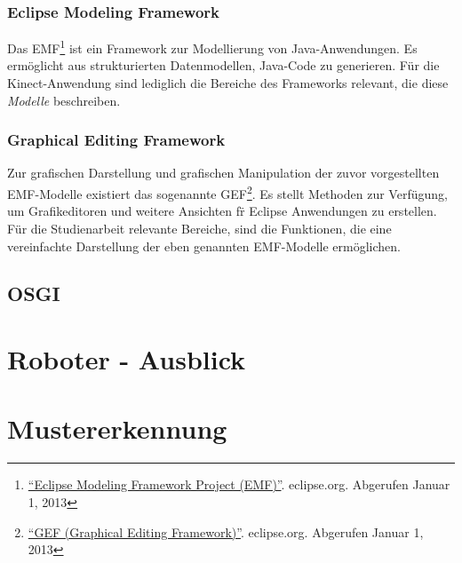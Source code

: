 \subsubsection{Eclipse Modeling Framework}
Das \gls{EMF}\footnote{\href{http://www.eclipse.org/modeling/emf/}{\enquote{Eclipse Modeling Framework Project (EMF)}}. eclipse.org. Abgerufen Januar 1, 2013} ist ein Framework zur Modellierung von Java-Anwendungen.
Es erm\"oglicht aus strukturierten Datenmodellen, Java-Code zu generieren. F\"ur die Kinect-Anwendung sind lediglich die Bereiche des Frameworks relevant, die diese \textit{Modelle} beschreiben.
 
\subsubsection{Graphical Editing Framework}
Zur grafischen Darstellung und grafischen Manipulation der zuvor vorgestellten EMF-Modelle existiert das sogenannte \gls{GEF}\footnote{\href{http://www.eclipse.org/gef/}{\enquote{GEF (Graphical Editing Framework)}}. eclipse.org. Abgerufen Januar 1, 2013}.
Es stellt Methoden zur Verf\"ugung, um Grafikeditoren und weitere Ansichten f\"r Eclipse Anwendungen zu erstellen. F\"ur die Studienarbeit relevante Bereiche, sind die Funktionen, die eine vereinfachte Darstellung der eben genannten EMF-Modelle erm\"oglichen.


\subsection{OSGI}


\section {Roboter - Ausblick}

\section{Mustererkennung}

